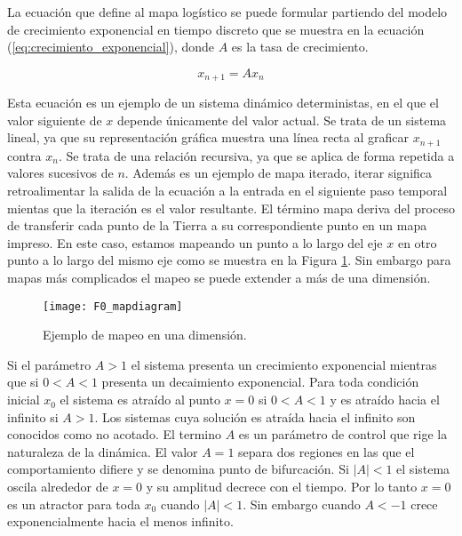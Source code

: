         La ecuación que define al mapa logístico se puede formular partiendo del modelo de crecimiento exponencial en tiempo discreto que se muestra en la ecuación (\ref{eq:crecimiento_exponencial}), donde $A$ es la tasa de crecimiento.

        \begin{equation}
            x_{n+1} = A x_{n}
            \label{eq:crecimiento_exponencial}
        \end{equation}

        Esta ecuación es un ejemplo de un sistema dinámico deterministas, en el que el valor siguiente de $x$ depende únicamente del valor actual. Se trata de un sistema lineal, ya que su representación gráfica muestra una línea recta al graficar $x_{n+1}$ contra $x_{n}$. Se trata de una relación recursiva, ya que se aplica de forma repetida a valores sucesivos de $n$. Además es un ejemplo de mapa iterado, iterar significa retroalimentar la salida de la ecuación a la entrada en el siguiente paso temporal mientas que la iteración es el valor resultante. El término mapa deriva del proceso de transferir cada punto de la Tierra a su correspondiente punto en un mapa impreso. En este caso, estamos mapeando un punto a lo largo del eje $x$ en otro punto a lo largo del mismo eje como se muestra en la Figura \ref{fig:F0_mapdiagram}. Sin embargo para mapas más complicados el mapeo se puede extender a más de una dimensión. 


        \begin{figure}[hbtp]
            \caption{Ejemplo de mapeo en una dimensión.}
            \centering
            \texttt{[image: F0\_mapdiagram]}
            \label{fig:F0_mapdiagram}
        \end{figure}


        Si el parámetro $A > 1$ el sistema presenta un crecimiento exponencial mientras que si $0 < A < 1$ presenta un decaimiento exponencial. Para toda condición inicial $x_{0}$ el sistema es atraído al punto $x = 0$ si $0 < A < 1$ y es atraído hacia el infinito si $A > 1$. Los sistemas cuya solución es atraída hacia el infinito son conocidos como no acotado. El termino $A$ es un parámetro de control que rige la naturaleza de la dinámica. El valor $A = 1$ separa dos regiones en las que el comportamiento difiere y se denomina punto de bifurcación. Si $|A| < 1$ el sistema oscila alrededor de $x = 0$ y su amplitud decrece con el tiempo. Por lo tanto $x = 0$ es un atractor para toda $x_{0}$ cuando $|A| < 1$. Sin embargo cuando $A< -1$ crece exponencialmente hacia el menos infinito.

